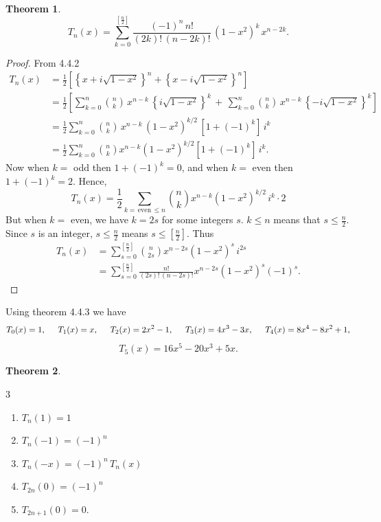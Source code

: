 \documentclass[12pt,a4paper]{report}
\theoremstyle{definition}
\newtheorem{thm}{Theorem}[section]
\theoremstyle{plain}
\begin{document}
\begin{thm}
$$T_n(x) = \sum_{k =0 }^{\left[\frac{n}{2}\right]}\frac{(-1)^n\, n!}{(2k)!\, (n-2k)!}\, (1 - x^2)^k\, x^{n-2k}.$$
\end{thm}

\begin{proof}
From 4.4.2
\begin{align*}
T_n(x) & = \frac{1}{2}\left[\left\{x + i\sqrt{1 - x^2}\right\}^n + \left\{x - i\sqrt{1 - x^2}\right\}^n\right]\\
       & = \frac{1}{2}\left[\sum^{n}_{k = 0} \binom{n}{k}\, x^{n-k}\, \left\{i\sqrt{1 - x^2}\right\}^k \, + \, \sum_{k=0}^n\binom{n}{k}\, x^{n-k}\, \left\{-i\sqrt{1 - x^2}\right\}^k\right]\\
       & = \frac{1}{2}\sum^n_{k=0}\binom{n}{k}\, x^{n-k}\, (1 - x^2)^{k/2}\, \left[1 + (-1)^k\right] \, i^k\\
       & = \frac{1}{2}\sum^n_{k=0}\binom{n}{k}x^{n-k}(1-x^2)^{k/2}\left[1 + (-1)^k\right]\, i^k.
\end{align*}
Now when $k = $ odd then $1 + (-1)^k  = 0$, and when $k = $ even then $1 + (-1)^k = 2$.  Hence, 
$$T_n(x) = \frac{1}{2}\sum_{k = \, \text{even}\, \leq n} \binom{n}{k} x^{n-k}(1 - x^2)^{k/2}\, i^k \cdot 2$$
But when $k = $ even, we have $k = 2s$ for some integers $s$. $k \leq n$ means that $s \leq \frac{n}{2}$. Since $s$ is an integer, $s \leq \frac{n}{2}$ means $s \leq \left[\frac{n}{2}\right]$. Thus 
\begin{align*}
T_n(x) & = \sum^{\left[\frac{n}{2}\right]}_{s = 0} \binom{n}{2s} x^{n-2s} (1 - x^2)^{s}\, i^{2s}\\
       & = \sum^{\left[\frac{n}{2}\right]}_{s =0} \frac{n!}{(2s)!\, (n-2s)!}x^{n-2s}(1 - x^2)^s(-1)^s.
\end{align*}
\end{proof}


Using theorem 4.4.3 we have 
$$ T_0(x) = 1, \hspace{0.5cm} T_1(x) = x, \hspace{0.5cm} T_2(x) = 2x^2 - 1, \hspace{0.5cm} T_3(x) = 4x^3 - 3x, \hspace{0.5cm} T_4(x) = 8x^4 - 8x^2 + 1,$$  $$ T_5(x) = 16x^5 - 20x^3 + 5x.$$


\begin{thm}\textbf{}
\vspace{-4mm}
\begin{multicols}{3}
\begin{enumerate}
\item[(a).] $T_n(1) = 1$
\item[(b).] $T_n(-1) = (-1)^n$
\item[(c).] $T_n(-x) = (-1)^n\, T_n(x)$
\item[(d).] $T_{2n}(0) = (-1)^n$
\item[(e).] $ T_{2n+1}(0) = 0.$
\end{enumerate}
\end{multicols}
\end{thm}
\end{document}
